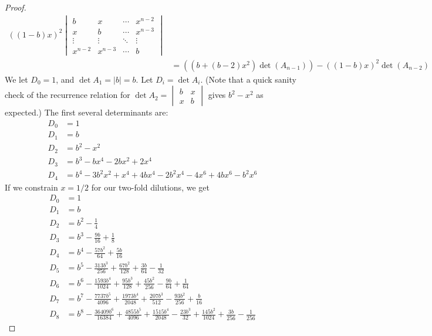 \documentclass[11pt, letterpaper]{article}
\numberwithin{equation}{section}
\begin{document}
\begin{proof}
\begin{align*}
\left((1-b)x\right)^2 \begin{vmatrix}
b & x  & \cdots & x^{n-2} \\
x & b & \cdots & x^{n-3} \\
\vdots & \vdots & \ddots & \vdots \\
x^{n-2} & x^{n-3} & \cdots & b
\end{vmatrix} \\
& = \left(\left(b + (b-2)x^2\right) \det (A_{n-1}) \right) - 
\left((1-b)x\right)^2 \det (A_{n-2})
\end{align*}
We let $D_0 = 1$, and $\det A_1 = |b| = b$. Let $D_i = \det A_i$. (Note that a quick sanity check of the recurrence relation for $\det A_2 = \begin{vmatrix}
b & x \\ x & b
\end{vmatrix}$ gives $b^2-x^2$ as expected.) The first several determinants are:
\begin{align*}
D_0 &= 1\\
D_1 &= b\\
D_2 &= b^2 - x^2 \\
D_3 &= b^3 - bx^4 - 2bx^2 + 2x^4 \\
D_4 &= b^4 - 3 b^2 x^2 + x^4 + 4 b x^4 - 2 b^2 x^4 - 4 x^6 + 4 b x^6 - b^2 x^6
\end{align*} 
If we constrain $x = 1/2$ for our two-fold dilutions, we get
\begin{align*}
D_0 &= 1\\
D_1 &= b\\
D_2 &= b^2 - \frac{1}{4} \\
D_3 &= b^3 - \frac{9b}{16} + \frac{1}{8} \\
D_4 &= b^4 - \frac{57 b^2}{64} + \frac{5 b}{16}\\
D_5 &= b^5 - \frac{313 b^3}{256} + \frac{67 b^2}{128} + \frac{3 b}{64} - \frac{1}{32} \\
D_6 &= b^6 - \frac{1593 b^4}{1024} + \frac{95 b^3}{128} + \frac{45 b^2}{256} - \frac{9 b}{64} + \frac{1}{64}\\
D_7 &= b^7 - \frac{7737 b^5}{4096} + \frac{1973 b^4}{2048} + \frac{207 b^3}{512} - \frac{93 b^2}{256} + \frac{b}{16} \\
D_8 &= b^8 - \frac{36409 b^6}{16384} + \frac{4855 b^5}{4096} + \frac{1515 b^4}{2048} - \frac{23 b^3}{32} + \frac{145 b^2}{1024} + \frac{3 b}{256} - \frac{1}{256}
\end{align*}





\end{proof}
\end{document}
